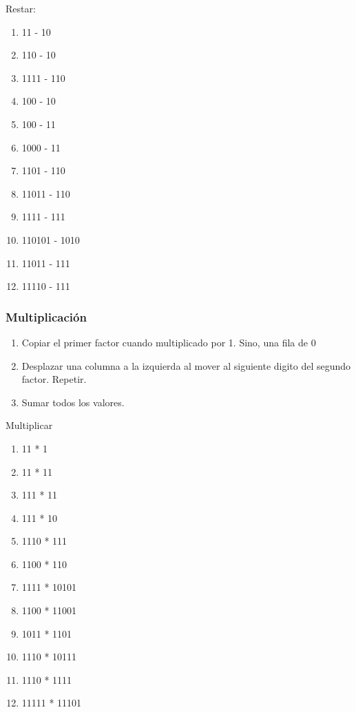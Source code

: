 \begin{frame}
    \begin{ejercicio}{}
        Restar:
        \begin{enumerate}
            \item 11 - 10	
            \item 110 - 10	
            \item 1111 - 110	
            \item 100 - 10	
            \item 100 - 11	
            \item 1000 - 11	
            \item 1101 - 110	
            \item 11011 - 110	
            \item 1111 - 111	
            \item 110101 - 1010	
            \item 11011 - 111	
            \item 11110 - 111
        \end{enumerate}
    \end{ejercicio}
\end{frame}

\begin{frame}
    \frametitle{Multiplicaci\'on}
    \begin{enumerate}
        \item Copiar el primer factor cuando multiplicado por 1. Sino, una fila de 0
        \item Desplazar una columna a la izquierda al mover al siguiente digito del segundo factor. Repetir.
        \item Sumar todos los valores.
    \end{enumerate}
\end{frame}


\begin{frame}
    \begin{ejercicio}{}
        Multiplicar
        \begin{enumerate}
            \item 11 * 1	
            \item 11 * 11	
            \item 111 * 11	
            \item 111 * 10	
            \item 1110 * 111	
            \item 1100 * 110	
            \item 1111 * 10101	
            \item 1100 * 11001	
            \item 1011 * 1101	
            \item 1110 * 10111	
            \item 1110 * 1111	
            \item 11111 * 11101	
        \end{enumerate}
    \end{ejercicio}
\end{frame}


